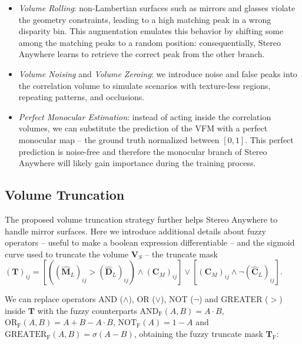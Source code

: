 \documentclass[10pt,twocolumn,letterpaper]{article}
\newcommand{\method}[0]{Stereo Anywhere\xspace}
\begin{document}
\begin{itemize}
    \item \textit{Volume Rolling}: non-Lambertian surfaces such as mirrors and glasses violate the geometry constraints, leading to a high matching peak in a wrong disparity bin. This augmentation emulates this behavior by shifting some among the matching peaks to a random position: consequentially, \method learns to retrieve the correct peak from the other branch. \\
    \item \textit{Volume Noising} and \textit{Volume Zeroing}: we introduce noise and false peaks into the correlation volume to simulate scenarios with texture-less regions, repeating patterns, and occlusions. \\
    \item \textit{Perfect Monocular Estimation}: instead of acting inside the correlation volumes, we can substitute the prediction of the VFM with a perfect monocular map  -- the ground truth normalized between $[0,1]$. This perfect prediction is noise-free and therefore the monocular branch of \method will likely gain importance during the training process.
\end{itemize}

\subsection{Volume Truncation}
\label{subsec:vol_trunc}

The proposed volume truncation strategy further helps \method to handle mirror surfaces.
Here we introduce additional details about fuzzy operators -- useful to make a boolean expression differentiable -- and the sigmoid curve used to truncate the volume $\mathbf{V}_S$  -- the truncate mask $(\mathbf{T})_{ij} = \left[\left((\hat{\mathbf{M}}_L)_{ij} >(\hat{\mathbf{D}}_L)_{ij}\right) \land (\mathbf{C}_M)_{ij} \right] \lor \left[ (\mathbf{C}_M)_{ij} \land \neg(\hat{\mathbf{C}}_L)_{ij} \right]$.

We can replace operators AND ($\land$), OR ($\lor$), NOT ($\neg$) and GREATER ($>$) inside $\mathbf{T}$ with the fuzzy counterparts $\text{AND}_\text{F}(A,B) = A \cdot B$, $\text{OR}_\text{F}(A,B) = A+B-A \cdot B$, $\text{NOT}_\text{F}(A) = 1- A$ and $\text{GREATER}_\text{F}(A,B) = \sigma(A-B)$, obtaining the fuzzy truncate mask $\mathbf{T}_\text{F}$:
\end{document}

